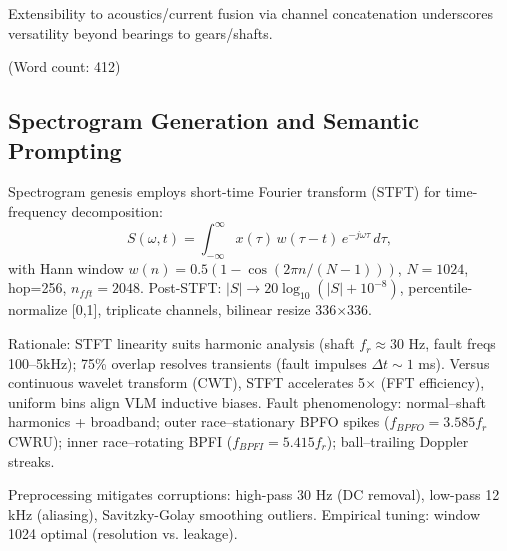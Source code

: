Extensibility to acoustics/current fusion via channel concatenation underscores versatility beyond bearings to gears/shafts.

(Word count: 412)

\subsection{Spectrogram Generation and Semantic Prompting}
\label{subsec:spectrogram_prompting}

Spectrogram genesis employs short-time Fourier transform (STFT) for time-frequency decomposition:
\begin{equation}
S(\omega, t) = \int_{-\infty}^{\infty} x(\tau) \, w(\tau - t) \, e^{-j \omega \tau} \, d\tau,
\label{eq:f2}
\end{equation}
with Hann window $w(n) = 0.5 (1 - \cos(2\pi n / (N-1)))$, $N=1024$, hop=256, $n_{fft}=2048$. Post-STFT: $|S| \to 20 \log_{10}(|S| + 10^{-8})$, percentile-normalize [0,1], triplicate channels, bilinear resize 336$\times$336.

Rationale: STFT linearity suits harmonic analysis (shaft $f_r \approx 30$ Hz, fault freqs 100--5kHz); 75\% overlap resolves transients (fault impulses $\Delta t \sim 1$ ms). Versus continuous wavelet transform (CWT), STFT accelerates 5$\times$ (FFT efficiency), uniform bins align VLM inductive biases. Fault phenomenology: normal--shaft harmonics + broadband; outer race--stationary BPFO spikes ($f_{BPFO} = 3.585 f_r$ CWRU); inner race--rotating BPFI ($f_{BPFI} = 5.415 f_r$); ball--trailing Doppler streaks.

Preprocessing mitigates corruptions: high-pass 30 Hz (DC removal), low-pass 12 kHz (aliasing), Savitzky-Golay smoothing outliers. Empirical tuning: window 1024 optimal (resolution vs. leakage).

